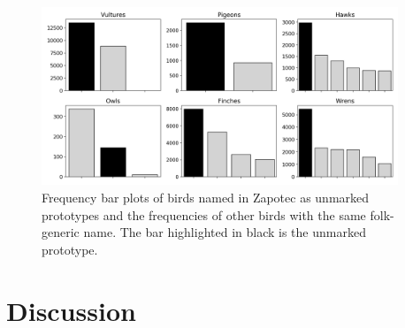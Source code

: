 \documentclass[10pt,letterpaper]{article}
\begin{document}


\begin{figure}[ht!]
  \begin{center}
    \includegraphics[width=0.95\textwidth]{./figures/prototypes-barplots-all.png}
        \caption{Frequency bar plots of birds named in Zapotec as unmarked prototypes and the frequencies of other birds with the same folk-generic name. The bar highlighted in black is the unmarked prototype.}
        \label{fig-freq-prototype-all}
  \end{center}
\end{figure}


\section{Discussion}


\end{document}
